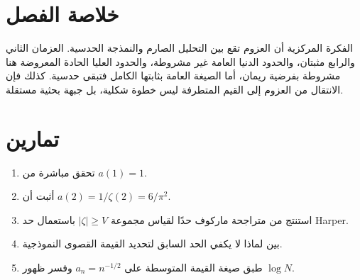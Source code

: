 \section*{خلاصة الفصل}

الفكرة المركزية أن العزوم تقع بين التحليل الصارم والنمذجة الحدسية. العزمان الثاني والرابع مثبتان، والحدود الدنيا العامة غير مشروطة، والحدود العليا الحادة المعروضة هنا مشروطة بفرضية ريمان، أما الصيغة العامة بثابتها الكامل فتبقى حدسية. كذلك فإن الانتقال من العزوم إلى القيم المتطرفة ليس خطوة شكلية، بل جبهة بحثية مستقلة.

\section*{تمارين}
\begin{enumerate}
  \item تحقق مباشرة من \(a(1)=1\).
  \item أثبت أن \(a(2)=1/\zeta(2)=6/\pi^2\).
  \item استنتج من متراجحة ماركوف حدًا لقياس مجموعة \(|\zeta|\ge V\) باستعمال حد Harper.
  \item بين لماذا لا يكفي الحد السابق لتحديد القيمة القصوى النموذجية.
  \item طبق صيغة القيمة المتوسطة على \(a_n=n^{-1/2}\) وفسر ظهور \(\log N\).
\end{enumerate}
